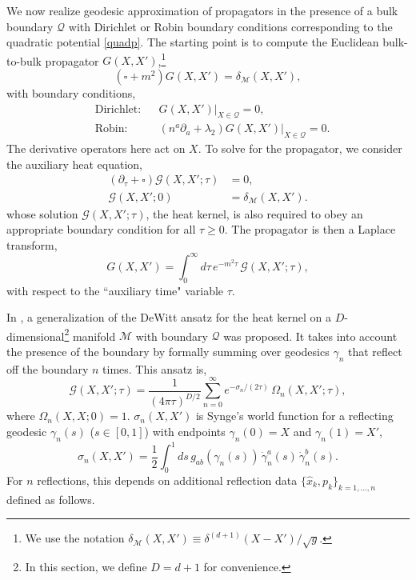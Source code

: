 \documentclass[reprint,amsmath,amssymb,aps,nofootinbib,twocolumn]{revtex4-2}
\begin{document}
We now realize geodesic approximation of propagators in the presence of a bulk boundary $\mathcal{Q}$ with Dirichlet or Robin boundary conditions corresponding to the quadratic potential \eqref{quadp}. The starting point is to compute the Euclidean bulk-to-bulk propagator $G(X,X')$,\footnote{We use the notation $ \delta_{\mathcal{M}}(X,X') \equiv \delta^{(d+1)}(X-X')\slash \sqrt{g} $.}
\begin{equation}
(\square + m^2)G(X,X') = \delta_{\mathcal{M}}(X,X'),
\end{equation}
with boundary conditions,
\begin{align}
&\text{Dirichlet:} && G(X,X')|_{X \in \mathcal{Q}} = 0,\label{BCs1}\\
&\text{Robin:} && (n^a\partial_a + \lambda_2)G(X,X')|_{X \in \mathcal{Q}} = 0.
\label{BCs2}
\end{align}
The derivative operators here act on $ X $. To solve for the propagator, we consider the auxiliary heat equation,
\begin{equation}
\begin{split}
\left(\partial_\tau +  \square\right)\mathcal{G}(X,X';\tau) &= 0,\\
\mathcal{G}(X,X';0) &= \delta_{\mathcal{M}}(X,X').
\end{split}
\label{heateq}
\end{equation}
whose solution $ \mathcal{G}(X,X';\tau) $, the heat kernel, is also required to obey an appropriate boundary condition for all $ \tau \geq 0 $. The propagator is then a Laplace transform,
\begin{equation}
G(X,X') = \int_0^\infty d\tau\,e^{-m^{2}\tau}\, \mathcal{G}(X,X';\tau),\label{laplace}
\end{equation}
with respect to the ``auxiliary time" variable $ \tau $.%

In \cite{McAvity_1991,mcavity_asymptotic_1991,mcavity_quantum_1993}, a generalization of the DeWitt ansatz for the heat kernel on a $D$-dimensional\footnote{In this section, we define $D = d+1$ for convenience.} manifold $\mathcal{M}$ with boundary $\mathcal{Q}$ was proposed. It takes into account the presence of the boundary by formally summing over geodesics $ \gamma_n $ that reflect off the boundary $ n $ times. This ansatz is,
\begin{equation}
\mathcal{G}(X,X';\tau) = \frac{1}{(4\pi\tau)^{D\slash 2}} \sum_{n=0}^{\infty}e^{-\sigma_n\slash (2\tau)}\,\Omega_n(X,X';\tau),
\label{dewitt}
\end{equation}
where $ \Omega_n(X,X;0) = 1 $. $ \sigma_n(X,X') $ is Synge's world function \cite{poisson_motion_2011} for a reflecting geodesic $ \gamma_n(s) $ ($s \in [0,1]$) with endpoints $ \gamma_n(0) = X $ and $ \gamma_n(1) = X' $,
\begin{equation}
\sigma_n(X,X') = \frac{1}{2}\int_0^1 ds\,g_{ab}(\gamma_n(s))\,\dot{\gamma}_n^a(s)\, \dot{\gamma}_n^b(s).
\end{equation}
For $n$ reflections, this depends on additional reflection data $\{\hat{x}_k,p_k\}_{k=1,...,n}$ defined as follows. 
\end{document}
